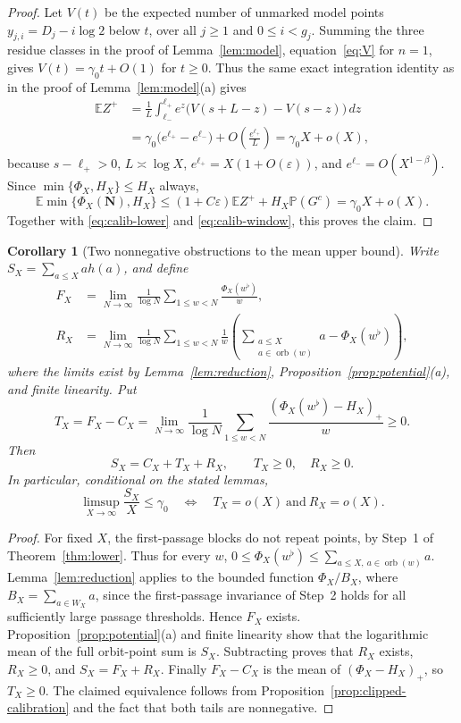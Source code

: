 \documentclass[12pt]{amsart}
\newtheorem{corollary}{Corollary}
\theoremstyle{definition}
\theoremstyle{remark}
\begin{document}
\begin{proof}
Let $V(t)$ be the expected number of unmarked model points
$y_{j,i}=D_j-i\log2$ below $t$, over all $j\ge1$ and
$0\le i<g_j$. Summing the three residue classes in the proof of
Lemma~\ref{lem:model}, equation~\eqref{eq:V} for $n=1$, gives
$V(t)=\gamma_0t+O(1)$ for $t\ge0$. Thus the same exact
integration identity as in the proof of Lemma~\ref{lem:model}(a)
gives
\[
 \begin{aligned}
 \mathbb EZ^+
 &=\frac1L\int_{\ell_-}^{\ell_+}e^z
             \bigl(V(s+L-z)-V(s-z)\bigr)\,dz\\
 &=\gamma_0\bigl(e^{\ell_+}-e^{\ell_-}\bigr)
       +O\left(\frac{e^{\ell_+}}L\right)
  =\gamma_0 X+o(X),
 \end{aligned}
\]
because $s-\ell_+>0$, $L\asymp\log X$,
$e^{\ell_+}=X(1+O(\varepsilon))$, and
$e^{\ell_-}=O(X^{1-\beta})$.
Since $\min\{\Phi_X,H_X\}\le H_X$ always,
\[
 \mathbb E\min\{\Phi_X(\mathbf N),H_X\}
 \le(1+C\varepsilon)\mathbb EZ^+
     +H_X\mathbb P(G^c)
 =\gamma_0X+o(X).
\]
Together with \eqref{eq:calib-lower} and
\eqref{eq:calib-window}, this proves the claim.
\end{proof}

\begin{corollary}[Two nonnegative obstructions to the mean upper bound]
\label{cor:two-tails}
Write $S_X=\sum_{a\le X}a h(a)$, and define
\[
\begin{aligned}
 F_X&=\lim_{N\to\infty}\frac1{\log N}
   \sum_{1\le w<N}\frac{\Phi_X(w^\flat)}w,\\
 R_X&=\lim_{N\to\infty}\frac1{\log N}
   \sum_{1\le w<N}\frac1w
   \left(\sum_{\substack{a\le X\\a\in\operatorname{orb}(w)}}a
   -\Phi_X(w^\flat)\right),
\end{aligned}
\]
where the limits exist by Lemma~\ref{lem:reduction},
Proposition~\ref{prop:potential}(a), and finite linearity.
Put
\[
 T_X=F_X-C_X
 =\lim_{N\to\infty}\frac1{\log N}
     \sum_{1\le w<N}\frac{(\Phi_X(w^\flat)-H_X)_+}{w}\ge0.
\]
Then
\[
 \boxed{S_X=C_X+T_X+R_X,\qquad T_X\ge0,\quad R_X\ge0.}
\]
In particular, conditional on the stated lemmas,
\[
 \limsup_{X\to\infty}\frac{S_X}{X}\le\gamma_0
 \quad\Longleftrightarrow\quad T_X=o(X)\ \text{and}\ R_X=o(X).
\]
\end{corollary}
\begin{proof}
For fixed $X$, the first-passage blocks do not repeat points,
by Step~1 of Theorem~\ref{thm:lower}. Thus for every $w$,
$0\le\Phi_X(w^\flat)\le
\sum_{a\le X,\ a\in\operatorname{orb}(w)}a$.
Lemma~\ref{lem:reduction} applies to the bounded function
$\Phi_X/B_X$, where $B_X=\sum_{a\in W_X}a$, since the first-passage
invariance of Step~2 holds for all sufficiently large passage
thresholds. Hence $F_X$ exists. Proposition~\ref{prop:potential}(a)
and finite linearity show that the logarithmic mean of the full
orbit-point sum is $S_X$. Subtracting proves that $R_X$ exists,
$R_X\ge0$, and $S_X=F_X+R_X$.
Finally $F_X-C_X$ is the mean of $(\Phi_X-H_X)_+$, so $T_X\ge0$. The claimed equivalence follows
from Proposition~\ref{prop:clipped-calibration} and the fact that
both tails are nonnegative.
\end{proof}
\end{document}
